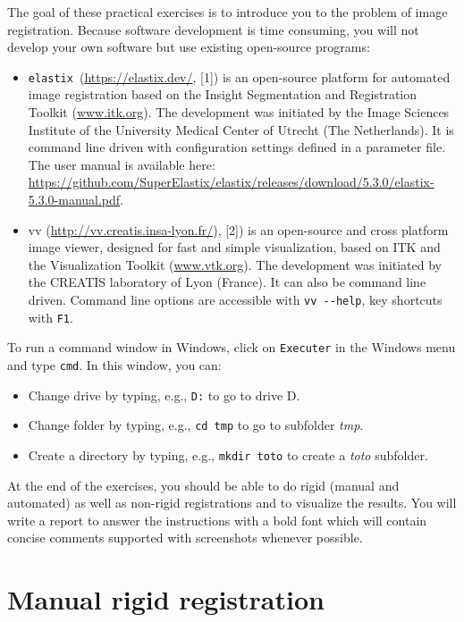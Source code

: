 \documentclass[]{report}
\newcommand{\elastix}{\texttt{elastix}}
\begin{document}
The goal of these practical exercises is to introduce you to the problem of
image registration. Because software development is time consuming, you will
not develop your own software but use existing open-source programs:
\begin{itemize}
\item \elastix\ (\url{https://elastix.dev/}, [1]) is an open-source
    platform for automated image registration based on the Insight
    Segmentation and Registration Toolkit (\url{www.itk.org}). The
    development was initiated by the Image Sciences Institute of the
    University Medical Center of Utrecht (The Netherlands). It is command
    line driven with configuration settings defined in a parameter file.
    The user manual is available here:
    \url{https://github.com/SuperElastix/elastix/releases/download/5.3.0/elastix-5.3.0-manual.pdf}.
\item vv (\url{http://vv.creatis.insa-lyon.fr/}), [2]) is an open-source
    and cross platform image viewer, designed for fast and simple
    visualization, based on ITK and the Visualization Toolkit
    (\url{www.vtk.org}). The development was initiated by the CREATIS
    laboratory of Lyon (France). It can also be command line driven.
    Command line options are accessible with \verb+vv --help+, key
    shortcuts with \verb+F1+.
\end{itemize}

To run a command window in Windows, click on \verb+Executer+ in the Windows
menu and type \verb+cmd+. In this window, you can:
\begin{itemize}
    \item Change drive by typing, e.g., \verb+D:+ to go to drive D.
    \item Change folder by typing, e.g., \verb+cd tmp+ to go to subfolder
\textit{tmp}.
    \item Create a directory by typing, e.g., \verb+mkdir toto+ to create a
\textit{toto} subfolder.
\end{itemize}

At the end of the exercises, you should be able to do rigid (manual and
automated) as well as non-rigid registrations and to visualize the results. You
will write a report to answer the instructions with a bold font which will
contain concise comments supported with screenshots whenever possible.

\section{Manual rigid registration}
\end{document}
